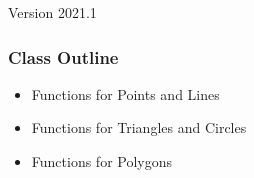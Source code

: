 \documentclass[aspectratio=169]{beamer}
\subtitle[Week 9: Geometry]{Week 9 - Computational Geometry}
\date[]{{\smaller(last updated: \today)}}
\begin{document}
\begin{CJK}{UTF8}{ipxm}

\begin{frame}
\maketitle
\vfill

\hfill Version 2021.1
\end{frame}

\begin{frame}
  \frametitle{Class Outline}

  \begin{itemize}
    \item Functions for Points and Lines
    \item Functions for Triangles and Circles
    \item Functions for Polygons
  \end{itemize}
\end{frame}






\end{CJK}
\end{document}
